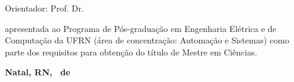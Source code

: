 \begin{titlepage}
\begin{center}

\LARGE
\textbf{\titulo}

\vfill

\Large
\textbf{\autor}

\vfill

\normalsize
Orientador: Prof. Dr. \orientador

\vfill

\hfill
\parbox{0.5\linewidth}{\textbf{\documento} apresentada ao Programa
de Pós-graduação em Engenharia Elétrica e de Computação da UFRN (área de
concentração: Automação e Sistemas) como parte dos requisitos para obtenção do
título de Mestre em Ciências.}

\vfill

\large
\textbf{Natal, RN, \Mesaprovacao\ de \Anoaprovacao}

\end{center}

\end{titlepage}
